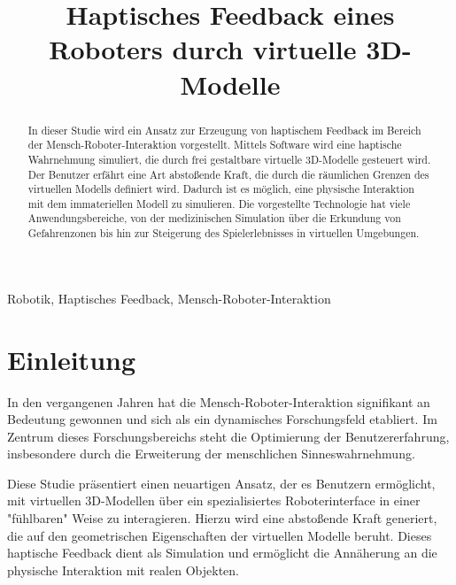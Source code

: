 \documentclass[conference]{IEEEtran}
\begin{document}
\title{Haptisches Feedback eines Roboters durch virtuelle 3D-Modelle}

\author{
    \and
}
\maketitle

\begin{abstract}
In dieser Studie wird ein Ansatz zur Erzeugung von haptischem Feedback im Bereich der Mensch-Roboter-Interaktion vorgestellt. Mittels Software wird eine haptische Wahrnehmung simuliert, die durch frei gestaltbare virtuelle 3D-Modelle gesteuert wird. Der Benutzer erfährt eine Art abstoßende Kraft, die durch die räumlichen Grenzen des virtuellen Modells definiert wird. Dadurch ist es möglich, eine physische Interaktion mit dem immateriellen Modell zu simulieren. Die vorgestellte Technologie hat viele Anwendungsbereiche, von der medizinischen Simulation über die Erkundung von Gefahrenzonen bis hin zur Steigerung des Spielerlebnisses in virtuellen Umgebungen.  

\end{abstract}

\begin{IEEEkeywords}
    Robotik, Haptisches Feedback, Mensch-Roboter-Interaktion
\end{IEEEkeywords}

\section{Einleitung}

In den vergangenen Jahren hat die Mensch-Roboter-Interaktion signifikant an Bedeutung gewonnen und sich als ein dynamisches Forschungsfeld etabliert. Im Zentrum dieses Forschungsbereichs steht die Optimierung der Benutzererfahrung, insbesondere durch die Erweiterung der menschlichen Sinneswahrnehmung.

Diese Studie präsentiert einen neuartigen Ansatz, der es Benutzern ermöglicht, mit virtuellen 3D-Modellen über ein spezialisiertes Roboterinterface in einer "fühlbaren" Weise zu interagieren. Hierzu wird eine abstoßende Kraft generiert, die auf den geometrischen Eigenschaften der virtuellen Modelle beruht. Dieses haptische Feedback dient als Simulation und ermöglicht die Annäherung an die physische Interaktion mit realen Objekten.
\end{document}

